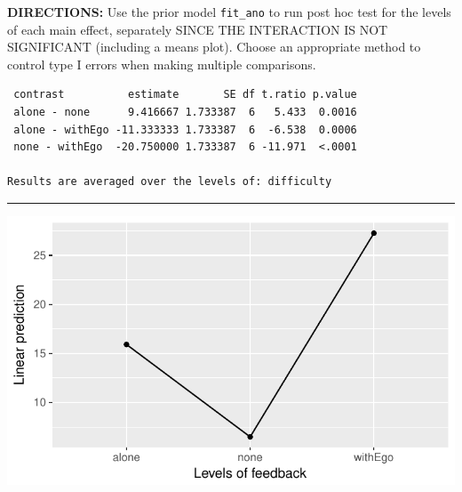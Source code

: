 \documentclass[]{article}
\newenvironment{Shaded}{\begin{snugshade}}{\end{snugshade}}
\newcommand{\KeywordTok}[1]{\textcolor[rgb]{0.13,0.29,0.53}{\textbf{#1}}}
\newcommand{\DataTypeTok}[1]{\textcolor[rgb]{0.13,0.29,0.53}{#1}}
\newcommand{\StringTok}[1]{\textcolor[rgb]{0.31,0.60,0.02}{#1}}
\newcommand{\CommentTok}[1]{\textcolor[rgb]{0.56,0.35,0.01}{\textit{#1}}}
\newcommand{\OperatorTok}[1]{\textcolor[rgb]{0.81,0.36,0.00}{\textbf{#1}}}
\newcommand{\NormalTok}[1]{#1}
\begin{document}
\textbf{DIRECTIONS:} Use the prior model \texttt{fit\_ano} to run post
hoc test for the levels of each main effect, separately SINCE THE
INTERACTION IS NOT SIGNIFICANT (including a means plot). Choose an
appropriate method to control type I errors when making multiple
comparisons.

\begin{Shaded}
\end{Shaded}

\begin{verbatim}
 contrast          estimate       SE df t.ratio p.value
 alone - none      9.416667 1.733387  6   5.433  0.0016
 alone - withEgo -11.333333 1.733387  6  -6.538  0.0006
 none - withEgo  -20.750000 1.733387  6 -11.971  <.0001

Results are averaged over the levels of: difficulty 
\end{verbatim}

\begin{center}\rule{0.5\linewidth}{\linethickness}\end{center}

\begin{Shaded}
\end{Shaded}

\begin{center}\includegraphics{Unit_5_assignment_KEY_R__spr18__files/figure-latex/unnamed-chunk-65-1} \end{center}
\end{document}

